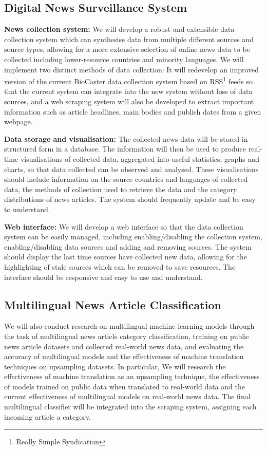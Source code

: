 \documentclass{l4proj}
\begin{document}
\subsection{Digital News Surveillance System} \hfill \par
\textbf{News collection system: }We will develop a robust and extensible data collection system which can synthesise data from multiple different sources and source types, allowing for a more extensive selection of online news data to be collected including lower-resource countries and minority languages. We will implement two distinct methods of data collection: It will redevelop an improved version of the current BioCaster data collection system based on RSS\footnote{Really Simple Syndication} feeds so that the current system can integrate into the new system without loss of data sources, and a web scraping system will also be developed to extract important information such as article headlines, main bodies and publish dates from a given webpage. \par
\textbf{Data storage and visualisation: }The collected news data will be stored in structured form in a database. The information will then be used to produce real-time visualisations of collected data, aggregated into useful statistics, graphs and charts, so that data collected can be observed and analysed. These visualisations should include information on the source countries and languages of collected data, the methods of collection used to retrieve the data and the category distributions of news articles. The system should frequently update and be easy to understand.\par
\textbf{Web interface: }We will develop a web interface so that the data collection system can be easily managed, including enabling/disabling the collection system, enabling/disabling data sources and adding and removing sources. The system should display the last time sources have collected new data, allowing for the highlighting of stale sources which can be removed to save resources. The interface should be responsive and easy to use and understand.
\subsection{Multilingual News Article Classification} \hfill \par
We will also conduct research on multilingual machine learning models through the task of multilingual news article category classification, training on public news article datasets and collected real-world news data, and evaluating the accuracy of multilingual models and the effectiveness of machine translation techniques on upsampling datasets. In particular, We will research the effectiveness of machine translation as an upsampling technique, the effectiveness of models trained on public data when translated to real-world data and the current effectiveness of multilingual models on real-world news data. The final multilingual classifier will be integrated into the scraping system, assigning each incoming article a category.
\end{document}
